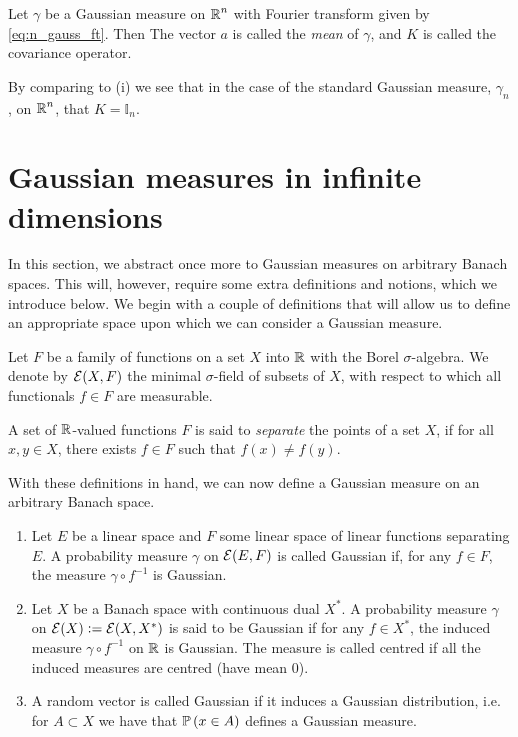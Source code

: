 \documentclass[../main.tex]{subfiles}
\begin{document}
\begin{corollary}
Let $\gamma$ be a Gaussian measure on $\operatorname{\mathbb{R}}^n$ with Fourier transform given by \eqref{eq:n_gauss_ft}. Then  The vector $a$ is called the \emph{mean} of $\gamma$, and $K$ is called the covariance operator.
\end{corollary}
\begin{remark}
By comparing  to (i) we see that in the case of the standard Gaussian measure, $\gamma_n$, on $\operatorname{\mathbb{R}}^n$, that $K = \mathbb{I}_n$.
\end{remark}

\section{Gaussian measures in infinite dimensions}
In this section, we abstract once more to Gaussian measures on arbitrary Banach spaces. This will, however, require some extra definitions and notions, which we introduce below. We begin with a couple of definitions that will allow us to define an appropriate space upon which we can consider a Gaussian measure.
\begin{definition}
\label{def:cyl_sets}
Let $F$ be a family of functions on a set $X$ into $\operatorname{\mathbb{R}}$ with the Borel $\sigma$-algebra. We denote by $\mathcal{E}(X,F)$ the minimal $\sigma$-field of subsets of $X$, with respect to which all functionals $f\in F$ are measurable.
\end{definition}
\begin{definition}
\label{def:separating_func}
A set of $\operatorname{\mathbb{R}}$-valued functions $F$ is said to \emph{separate} the points of a set $X$, if for all $x,y\in X$, there exists $f\in F$ such that $f(x)\neq f(y)$.
\end{definition}

With these definitions in hand, we can now define a Gaussian measure on an arbitrary Banach space.
\begin{definition}
\begin{enumerate}
    \item Let $E$ be a linear space and $F$ some linear space of linear functions separating $E$. A probability measure $\gamma$ on $\mathcal{E}(E,F)$ is called Gaussian if, for any $f\in F$, the measure $\gamma\circ f^{-1}$ is Gaussian.
    \item Let $X$ be a Banach space with continuous dual $X^*$. A probability measure $\gamma$ on $\mathcal{E}(X): = \mathcal{E}(X,X^*)$ is said to be Gaussian if for any $f\in X^*$, the induced measure $\gamma\circ f^{-1}$ on $\operatorname{\mathbb{R}}$ is Gaussian. The measure is called centred if all the induced measures are centred (have mean $0$).
    \item A random vector is called Gaussian if it induces a Gaussian distribution, i.e. for $A\subset X$ we have that $\mathbb{P}\del{x\in A}$ defines a Gaussian measure.
\end{enumerate}
\end{definition}
\end{document}
